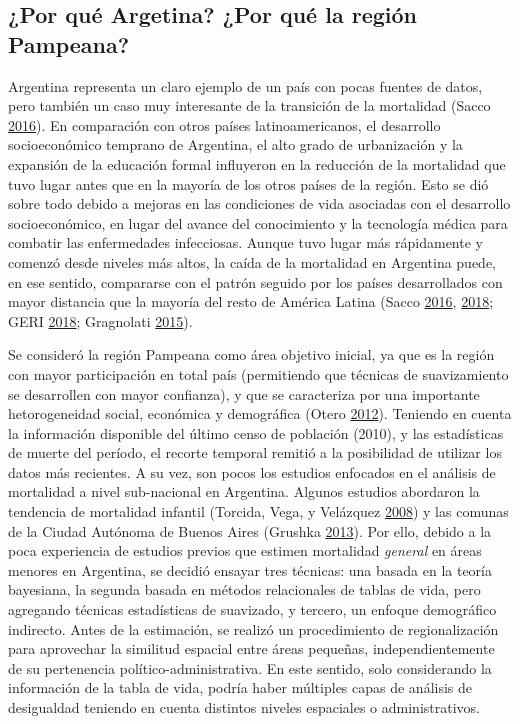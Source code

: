 \documentclass[12pt,spanish,]{article}
\begin{document}
\hypertarget{por-quuxe9-argetina-por-quuxe9-la-regiuxf3n-pampeana}{%
\subsection{¿Por qué Argetina? ¿Por qué la región
Pampeana?}\label{por-quuxe9-argetina-por-quuxe9-la-regiuxf3n-pampeana}}

Argentina representa un claro ejemplo de un país con pocas fuentes de
datos, pero también un caso muy interesante de la transición de la
mortalidad (Sacco \protect\hyperlink{ref-Sacco2016}{2016}). En
comparación con otros países latinoamericanos, el desarrollo
socioeconómico temprano de Argentina, el alto grado de urbanización y la
expansión de la educación formal influyeron en la reducción de la
mortalidad que tuvo lugar antes que en la mayoría de los otros países de
la región. Esto se dió sobre todo debido a mejoras en las condiciones de
vida asociadas con el desarrollo socioeconómico, en lugar del avance del
conocimiento y la tecnología médica para combatir las enfermedades
infecciosas. Aunque tuvo lugar más rápidamente y comenzó desde niveles
más altos, la caída de la mortalidad en Argentina puede, en ese sentido,
compararse con el patrón seguido por los países desarrollados con mayor
distancia que la mayoría del resto de América Latina (Sacco
\protect\hyperlink{ref-Sacco2016}{2016},
\protect\hyperlink{ref-SaccoBorges2018}{2018}; GERI
\protect\hyperlink{ref-GeriMoscoso2018}{2018}; Gragnolati
\protect\hyperlink{ref-Gragnolati2015}{2015}).

Se consideró la región Pampeana como área objetivo inicial, ya que es la
región con mayor participación en total país (permitiendo que técnicas
de suavizamiento se desarrollen con mayor confianza), y que se
caracteriza por una importante hetorogeneidad social, económica y
demográfica (Otero \protect\hyperlink{ref-Otero2012}{2012}). Teniendo en
cuenta la información disponible del último censo de población (2010), y
las estadísticas de muerte del período, el recorte temporal remitió a la
posibilidad de utilizar los datos más recientes. A su vez, son pocos los
estudios enfocados en el análisis de mortalidad a nivel sub-nacional en
Argentina. Algunos estudios abordaron la tendencia de mortalidad
infantil (Torcida, Vega, y Velázquez
\protect\hyperlink{ref-Torcida2008}{2008}) y las comunas de la Ciudad
Autónoma de Buenos Aires (Grushka
\protect\hyperlink{ref-Grushka2013}{2013}). Por ello, debido a la poca
experiencia de estudios previos que estimen mortalidad \emph{general} en
áreas menores en Argentina, se decidió ensayar tres técnicas: una basada
en la teoría bayesiana, la segunda basada en métodos relacionales de
tablas de vida, pero agregando técnicas estadísticas de suavizado, y
tercero, un enfoque demográfico indirecto. Antes de la estimación, se
realizó un procedimiento de regionalización para aprovechar la similitud
espacial entre áreas pequeñas, independientemente de su pertenencia
político-administrativa. En este sentido, solo considerando la
información de la tabla de vida, podría haber múltiples capas de
análisis de desigualdad teniendo en cuenta distintos niveles espaciales
o administrativos.
\end{document}
